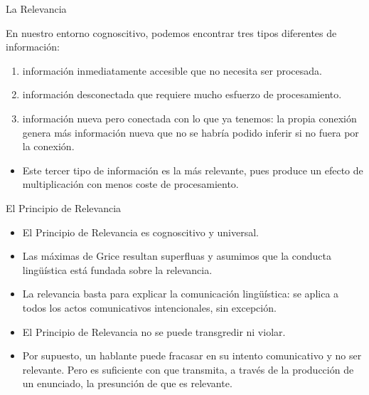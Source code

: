 \documentclass{beamer}
\begin{document}
\begin{frame}{La Relevancia}

	En nuestro entorno cognoscitivo, podemos encontrar tres tipos diferentes de información:
	
	\begin{enumerate}
		\item información inmediatamente accesible que no necesita ser procesada.
		\item información desconectada que requiere mucho esfuerzo de procesamiento.
		\item información nueva pero conectada con lo que ya tenemos: la propia conexión genera más información nueva 	que no se habría podido inferir si no fuera por la conexión.
	\end{enumerate}
	
	\begin{itemize}
		\item Este tercer tipo de información es la más relevante, pues produce un efecto de multiplicación con menos coste de procesamiento. 
	\end{itemize}

\end{frame}


\begin{frame}{El Principio de Relevancia}

	\begin{itemize}
		\item El Principio de Relevancia es cognoscitivo y universal.
		\item Las máximas de Grice resultan superfluas y asumimos que la conducta lingüística está fundada sobre la relevancia.
		\item La relevancia basta para explicar la comunicación lingüística: se aplica a todos los actos comunicativos intencionales, sin excepción.
		\item El Principio de Relevancia no se puede transgredir ni violar.
		\item Por supuesto, un hablante puede fracasar en su intento comunicativo y no ser relevante. Pero es suficiente con que transmita, a través de la producción de un enunciado, la presunción de que es relevante.
	\end{itemize}

\end{frame}
\end{document}
